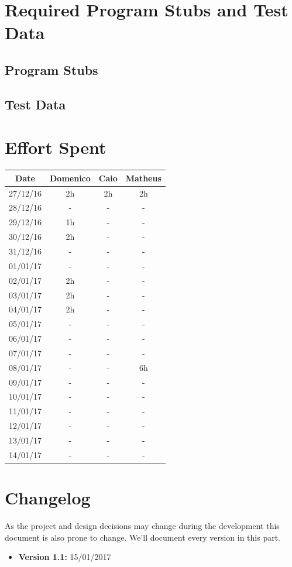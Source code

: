 \documentclass[a4paper]{article}
\begin{document}
\section{Required Program Stubs and Test Data}
\subsection{Program Stubs}
\subsection{Test Data}

\newpage
\section{Effort Spent}
\begin{tabular}{ | c | c | c | c | }
\hline
	\textbf {Date} & \textbf {Domenico} & \textbf {Caio} & \textbf {Matheus} \\ \hline
	27/12/16& 2h & 2h & 2h  \\ \hline
	28/12/16& - & - & - \\ \hline
	29/12/16& 1h & - & - \\ \hline
	30/12/16& 2h & - & - \\ \hline
	31/12/16& - & - & - \\ \hline
	01/01/17& - & - & - \\ \hline
	02/01/17& 2h & - & - \\ \hline
	03/01/17& 2h & - & - \\ \hline
	04/01/17& 2h & - & - \\ \hline
	05/01/17& - & - & - \\ \hline
	06/01/17& - & - & - \\ \hline
	07/01/17& - & - & - \\ \hline
	08/01/17& - & - & 6h \\ \hline
	09/01/17& - & - & - \\ \hline
	10/01/17& - & - & - \\ \hline
	11/01/17& - & - & - \\ \hline
	12/01/17& - & - & - \\ \hline
	13/01/17& - & - & - \\ \hline
	14/01/17& - & - & - \\ \hline
\end{tabular}
\newpage

\section{Changelog}
As the project and design decisions may change during the development this document is also prone to change.
We'll document every version in this part.
\begin{itemize}
\item \textbf {Version 1.1:} 15/01/2017
\end{itemize}
\end{document}

